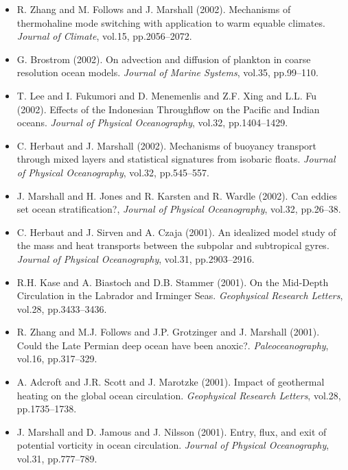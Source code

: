 \begin{itemize}
\item R. Zhang and M. Follows and J. Marshall (2002). Mechanisms of
thermohaline mode switching with application to warm equable climates.
{\it Journal of Climate}, vol.15, pp.2056--2072. 

\item G. Brostrom (2002). On advection and diffusion of plankton in coarse
resolution ocean models. {\it Journal of Marine Systems}, vol.35, pp.99--110. 

\item T. Lee and I. Fukumori and D. Menemenlis and Z.F. Xing and L.L. Fu
(2002). Effects of the Indonesian Throughflow on the Pacific and Indian
oceans. {\it Journal of Physical Oceanography}, vol.32, pp.1404--1429. 


\item C. Herbaut and J. Marshall (2002). Mechanisms of buoyancy transport
through mixed layers and statistical signatures from isobaric floats.
{\it Journal of Physical Oceanography}, vol.32, pp.545--557. 

\item J. Marshall and H. Jones and R. Karsten and R. Wardle (2002). Can
eddies set ocean stratification?, {\it Journal of Physical Oceanography},
vol.32, pp.26--38. 

\item C. Herbaut and J. Sirven and A. Czaja (2001). An idealized model
study of the mass and heat transports between the subpolar and
subtropical gyres. {\it Journal of Physical Oceanography}, vol.31,
pp.2903--2916. 

\item R.H. Kase and A. Biastoch and D.B. Stammer (2001). On the Mid-Depth
Circulation in the Labrador and Irminger Seas. {\it Geophysical Research
Letters}, vol.28, pp.3433--3436. 

\item R. Zhang and M.J. Follows and J.P. Grotzinger and J. Marshall
(2001). Could the Late Permian deep ocean have been anoxic?.
{\it Paleoceanography}, vol.16, pp.317--329. 

\item A. Adcroft and J.R. Scott and J. Marotzke (2001). Impact of
geothermal heating on the global ocean circulation. {\it Geophysical Research
Letters}, vol.28, pp.1735--1738. 

\item J. Marshall and D. Jamous and J. Nilsson (2001). Entry, flux, and
exit of potential vorticity in ocean circulation. {\it Journal of Physical
Oceanography}, vol.31, pp.777--789. 


\end{itemize}
